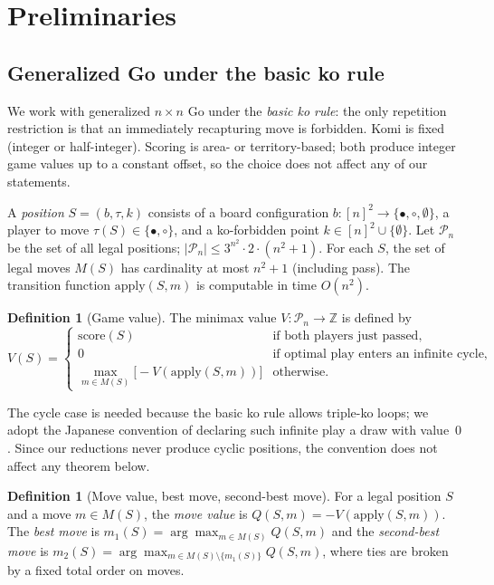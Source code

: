 \documentclass[11pt,a4paper]{amsart}
\theoremstyle{plain}
\theoremstyle{definition}
\newtheorem{definition}[theorem]{Definition}
\theoremstyle{remark}
\newcommand{\Ppoint}{[n]^2}
\newcommand{\Apply}{\mathrm{apply}}
\newcommand{\score}{\mathrm{score}}
\begin{document}
\section{Preliminaries}
\label{sec:prelim}

\subsection{Generalized Go under the basic ko rule}
\label{sec:rules}

We work with generalized $n \times n$ Go under the \emph{basic ko rule}:
the only repetition restriction is that an immediately recapturing move
is forbidden. Komi is fixed (integer or half-integer). Scoring is
area- or territory-based; both produce integer game values up to a
constant offset, so the choice does not affect any of our statements.

A \emph{position} $S = (b, \tau, k)$ consists of a board configuration
$b \colon \Ppoint \to \{\bullet, \circ, \emptyset\}$, a player to move
$\tau(S) \in \{\bullet, \circ\}$, and a ko-forbidden point
$k \in \Ppoint \cup \{\emptyset\}$. Let $\mathcal{P}_n$ be the set of all
legal positions; $|\mathcal{P}_n| \leq 3^{n^2} \cdot 2 \cdot (n^2 + 1)$.
For each $S$, the set of legal moves $M(S)$ has cardinality at most
$n^2 + 1$ (including pass).
The transition function $\Apply(S, m)$ is computable in time $O(n^2)$.

\begin{definition}[Game value]
\label{def:V}
The minimax value $V \colon \mathcal{P}_n \to \mathbb{Z}$ is defined by
\[
  V(S) = \begin{cases}
    \score(S) & \text{if both players just passed,} \\
    0 & \text{if optimal play enters an infinite cycle,} \\
    \displaystyle\max_{m \in M(S)} \bigl[-V(\Apply(S,m))\bigr] & \text{otherwise.}
  \end{cases}
\]
\end{definition}

The cycle case is needed because the basic ko rule allows triple-ko
loops; we adopt the Japanese convention of declaring such infinite play
a draw with value~$0$. Since our reductions never produce cyclic
positions, the convention does not affect any theorem below.

\begin{definition}[Move value, best move, second-best move]
\label{def:Q}
For a legal position $S$ and a move $m \in M(S)$, the
\emph{move value} is $Q(S, m) = -V(\Apply(S, m))$.
The \emph{best move} is $m_1(S) = \arg\max_{m \in M(S)} Q(S, m)$ and
the \emph{second-best move} is
$m_2(S) = \arg\max_{m \in M(S) \setminus \{m_1(S)\}} Q(S, m)$,
where ties are broken by a fixed total order on moves.
\end{definition}
\end{document}

